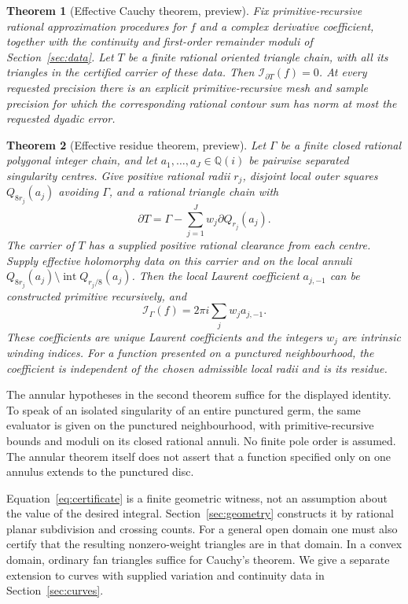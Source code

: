\documentclass[11pt]{article}
\newtheorem{theorem}{Theorem}[section]
\theoremstyle{definition}
\newcommand{\Q}{\mathbb Q}
\newcommand{\Int}{\mathcal I}
\newcommand{\bd}{\partial}
\begin{document}
\begin{theorem}[Effective Cauchy theorem, preview]\label{thm:previewc}
Fix primitive-recursive rational approximation procedures for \(f\) and a
complex derivative coefficient, together with the continuity and
first-order remainder moduli of Section~\ref{sec:data}. Let \(T\) be a
finite rational oriented triangle chain, with all its triangles in the
certified carrier of these data. Then \(\Int_{\bd T}(f)=0\).
At every requested precision there is an explicit primitive-recursive
mesh and sample precision for which the corresponding rational contour
sum has norm at most the requested dyadic error.
\end{theorem}

\begin{theorem}[Effective residue theorem, preview]\label{thm:previewr}
Let \(\Gamma\) be a finite closed rational polygonal integer chain, and
let \(a_1,\ldots,a_J\in\Q(i)\) be pairwise separated singularity centres.
Give positive rational radii \(r_j\), disjoint local outer squares
\(Q_{8r_j}(a_j)\) avoiding \(\Gamma\), and a rational triangle chain with
\begin{equation}\label{eq:certificate}
 \bd T=\Gamma-\sum_{j=1}^{J}w_j\bd Q_{r_j}(a_j).
\end{equation}
The carrier of \(T\) has a supplied positive rational clearance from
each centre. Supply effective holomorphy data
on this carrier and on the local annuli
\(Q_{8r_j}(a_j)\setminus\operatorname{int}Q_{r_j/8}(a_j)\).
Then the local Laurent coefficient \(a_{j,-1}\) can be constructed
primitive recursively, and
\[
 \Int_\Gamma(f)=2\pi i\sum_jw_j a_{j,-1}.
\]
These coefficients are unique Laurent coefficients and the integers
\(w_j\) are intrinsic winding indices. For a function presented on a
punctured neighbourhood, the coefficient is independent of the chosen
admissible local radii and is its residue.
\end{theorem}

The annular hypotheses in the second theorem suffice for the displayed
identity. To speak of an isolated singularity of an entire punctured germ,
the same evaluator is given on the punctured neighbourhood, with
primitive-recursive bounds and moduli on its closed rational annuli.
No finite pole order is assumed. The annular theorem itself does not
assert that a function specified only on one annulus extends to the
punctured disc.

Equation~\eqref{eq:certificate} is a finite geometric witness, not an
assumption about the value of the desired integral.
Section~\ref{sec:geometry} constructs it by rational planar subdivision
and crossing counts. For a general open domain one must also certify that
the resulting nonzero-weight triangles are in that domain. In a convex
domain, ordinary fan triangles suffice for Cauchy's theorem. We give a
separate extension to curves with supplied variation and continuity data
in Section~\ref{sec:curves}.
\end{document}
